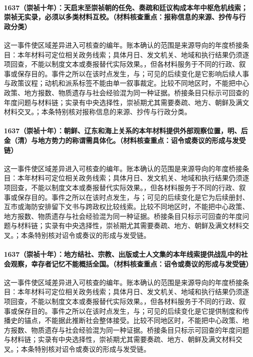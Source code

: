 \paragraph{1637（崇祯十年）：天启末至崇祯朝的任免、奏疏和廷议构成本年中枢危机线索；崇祯无实录，必须以多类材料互校。（材料核查重点：报称信息的来源、抄传与行政分类）} 这一事件使区域差异进入可核查的编年。账本确认的范围是来源导向的年度桥接条目：本年材料可定位相关政务线索；具体月日、发文机关、地域和执行结果仍须逐项回查，不能以制度文本或奏报替代实际效果。，但各材料服务于不同的行政、叙事或保存目的。事件之所以在该时点发生，与；可见的后续变化是它影响后续人事与政策议程；动机和派系标签不能由单一叙事裁定。比较不同地区时，不能把中心政策、地方报数、物质遗存与社会经验混为同一种证据。桥接条目只标示可回查的年度问题与材料链；实录有中央选择性，崇祯期尤其需要奏疏、地方、朝鲜及满文材料交叉。；本条特别核对报称信息的来源、抄传与行政分类。

\paragraph{1637（崇祯十年）：朝鲜、辽东和海上关系的本年材料提供外部观察位置，明、后金（清）与地方势力的称谓需具体化。（材料核查重点：诏令或奏议的形成与发受链）} 这一事件使区域差异进入可核查的编年。账本确认的范围是来源导向的年度桥接条目：本年材料可定位相关政务线索；具体月日、发文机关、地域和执行结果仍须逐项回查，不能以制度文本或奏报替代实际效果。，但各材料服务于不同的行政、叙事或保存目的。事件之所以在该时点发生，与；可见的后续变化是它为后续册封、互市或海防安排留下文书与跨政权比较线索。比较不同地区时，不能把中心政策、地方报数、物质遗存与社会经验混为同一种证据。桥接条目只标示可回查的年度问题与材料链；实录有中央选择性，崇祯期尤其需要奏疏、地方、朝鲜及满文材料交叉。；本条特别核对诏令或奏议的形成与发受链。

\paragraph{1637（崇祯十年）：地方结社、宗教、出版或士人文集的本年线索提供战乱中的社会观察，幸存者记忆不能概括全国。（材料核查重点：诏令或奏议的形成与发受链）} 这一事件使区域差异进入可核查的编年。账本确认的范围是来源导向的年度桥接条目：本年材料可定位相关政务线索；具体月日、发文机关、地域和执行结果仍须逐项回查，不能以制度文本或奏报替代实际效果。，但各材料服务于不同的行政、叙事或保存目的。事件之所以在该时点发生，与；可见的后续变化是它提供制度和传播史的锚点，不能据此推断社会整体接受。比较不同地区时，不能把中心政策、地方报数、物质遗存与社会经验混为同一种证据。桥接条目只标示可回查的年度问题与材料链；实录有中央选择性，崇祯期尤其需要奏疏、地方、朝鲜及满文材料交叉。；本条特别核对诏令或奏议的形成与发受链。

